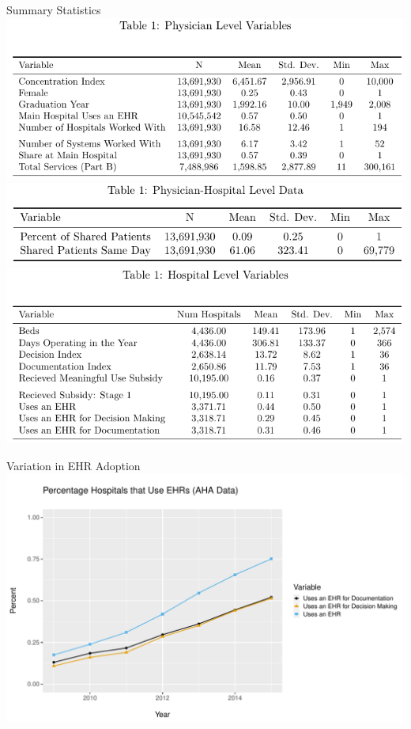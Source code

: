 \documentclass[10pt]{beamer}
\begin{document}
\begin{frame}{Summary Statistics}
\centering
\includegraphics[scale=.45]{Objects/sumstats_physician_table.pdf}\\
\vspace{3mm}
\includegraphics[scale=.45]{Objects/sumstats_pair_table.pdf}\\
\vspace{3mm}
\includegraphics[scale=.45]{Objects/sumstats_hospital_table.pdf}
\end{frame}

\begin{frame}{Variation in EHR Adoption}
\centering
\includegraphics[scale=.55]{Objects/TYP_plot_hospEHR_year.pdf}
\end{frame}
\end{document}
